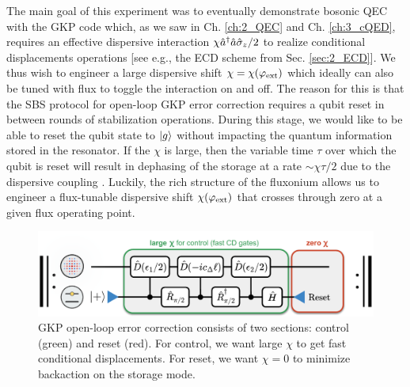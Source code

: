 The main goal of this experiment was to eventually demonstrate bosonic QEC with the GKP code which, as we saw in Ch. \ref{ch:2_QEC} and Ch. \ref{ch:3_cQED}, requires an effective dispersive interaction $\chi\hat{a}^\dagger\hat{a}\hat{\sigma}_z/2$ to realize conditional displacements operations [see e.g., the ECD scheme from Sec. \ref{sec:2_ECD}]. We thus wish to engineer a large dispersive shift $\chi = \chi(\varphi_{\rm ext})$ which ideally can also be tuned with flux to toggle the interaction on and off. The reason for this is that the SBS protocol for open-loop GKP error correction requires a qubit reset in between rounds of stabilization operations. During this stage, we would like to be able to reset the qubit state to $\lvert g\rangle$ without impacting the quantum information stored in the resonator. If the $\chi$ is large, then the variable time $\tau$ over which the qubit is reset will result in dephasing of the storage at a rate $\sim \chi\tau/2$ due to the dispersive coupling \cite{sivak2023gkp-expt, nordquantique2023gkp-expt}. Luckily, the rich structure of the fluxonium allows us to engineer a flux-tunable dispersive shift $\chi(\varphi_{\rm ext})$ that crosses through zero at a given flux operating point. 
\begin{figure}[h]
    \centering
    \includegraphics[width=0.85\linewidth]{Figures/4/SBS_Control_and_Reset.pdf}
    \caption[Control and reset phases of the open-loop GKP error correction.]{GKP open-loop error correction consists of two sections: control (green) and reset (red). For control, we want large $\chi$ to get fast conditional displacements. For reset, we want $\chi = 0$ to minimize backaction on the storage mode.}
    \label{fig:4_SBS_Control_and_Reset}
\end{figure}

